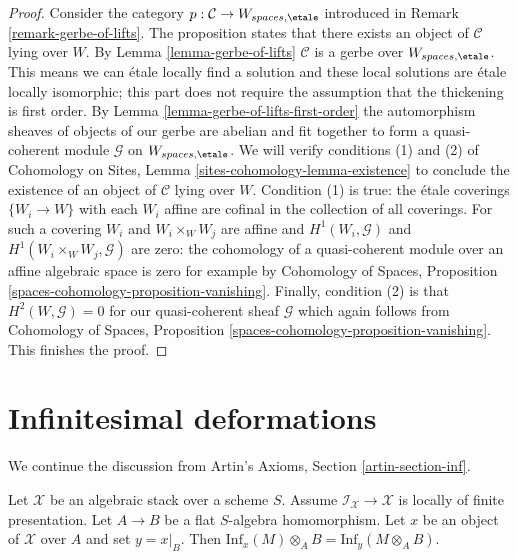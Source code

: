 \begin{proof}
Consider the category $p : \mathcal{C} \to W_{spaces, \etale}$
introduced in Remark \ref{remark-gerbe-of-lifts}.
The proposition states that there exists an object of $\mathcal{C}$
lying over $W$. By Lemma \ref{lemma-gerbe-of-lifts}
$\mathcal{C}$ is a gerbe over $W_{spaces, \etale}$.
This means we can \'etale locally find a solution and
these local solutions are \'etale locally isomorphic;
this part does not require the assumption that the thickening is first order.
By Lemma \ref{lemma-gerbe-of-lifts-first-order}
the automorphism sheaves of objects of our gerbe are abelian and
fit together to form a quasi-coherent module $\mathcal{G}$
on $W_{spaces, \etale}$. We will verify conditions (1) and (2)
of Cohomology on Sites, Lemma \ref{sites-cohomology-lemma-existence}
to conclude the existence of an object of $\mathcal{C}$ lying over $W$.
Condition (1) is true: the \'etale coverings $\{W_i \to W\}$
with each $W_i$ affine are cofinal in the collection of all coverings.
For such a covering $W_i$ and $W_i \times_W W_j$ are affine
and $H^1(W_i, \mathcal{G})$ and $H^1(W_i \times_W W_j, \mathcal{G})$
are zero: the cohomology of a quasi-coherent module over an affine
algebraic space is zero for example by Cohomology of Spaces, Proposition
\ref{spaces-cohomology-proposition-vanishing}.
Finally, condition (2) is that $H^2(W, \mathcal{G}) = 0$
for our quasi-coherent sheaf $\mathcal{G}$ which again follows
from Cohomology of Spaces, Proposition
\ref{spaces-cohomology-proposition-vanishing}.
This finishes the proof.
\end{proof}






\section{Infinitesimal deformations}
\label{section-inf}

\noindent
We continue the discussion from
Artin's Axioms, Section \ref{artin-section-inf}.

\begin{lemma}
\label{lemma-inf-quasi-coherent}
Let $\mathcal{X}$ be an algebraic stack over a scheme $S$.
Assume $\mathcal{I}_\mathcal{X} \to \mathcal{X}$ is locally
of finite presentation. Let $A \to B$ be a flat $S$-algebra homomorphism.
Let $x$ be an object of $\mathcal{X}$ over $A$ and set $y = x|_B$.
Then $\text{Inf}_x(M) \otimes_A B = \text{Inf}_y(M \otimes_A B)$.
\end{lemma}

